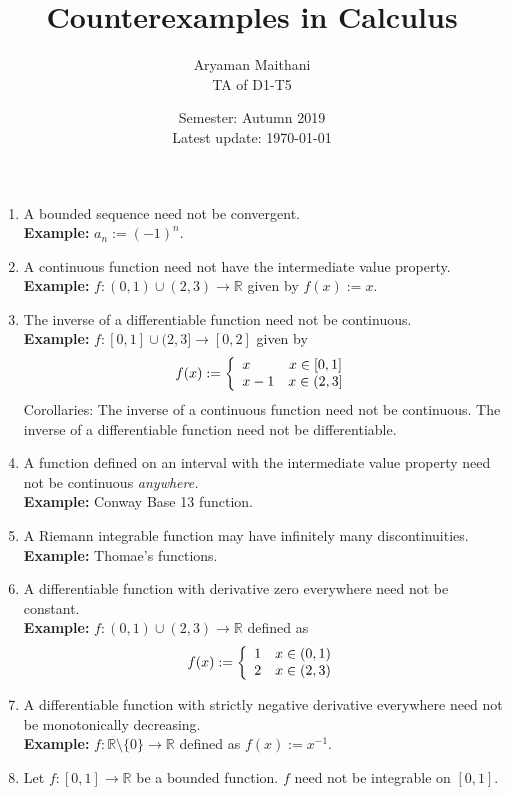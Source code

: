 \documentclass{article}
\title{Counterexamples in Calculus}
\author{Aryaman Maithani\\\small TA of D1-T5}
\date{Semester: Autumn 2019\\ Latest update: \today}
\begin{document}
\maketitle
\hrulefill
\begin{enumerate} 
	\item A bounded sequence need not be convergent.\\
	\textbf{Example:} $a_n := (-1)^n.$
	\item A continuous function need not have the intermediate value property.\\
	\textbf{Example:} $f:(0, 1) \cup (2, 3) \to \mathbb{R}$ given by $f(x) := x.$
	\item The inverse of a differentiable function need not be continuous.\\
	\textbf{Example:} $f:[0, 1] \cup (2, 3] \to [0, 2]$ given by
	\[f(x) := \left\{
	\begin{array}{l c}
		x & x \in [0, 1]\\
		x-1 & x \in (2, 3]		
	\end{array}
	\right.\]
	Corollaries: The inverse of a continuous function need not be continuous. The inverse of a differentiable function need not be differentiable.
	\item A function defined on an interval with the intermediate value property need not be continuous \emph{anywhere.}\\
	\textbf{Example:} Conway Base 13 function.
	\item A Riemann integrable function may have infinitely many discontinuities.\\
	\textbf{Example:} Thomae's functions.
	\item A differentiable function with derivative zero everywhere need not be constant.\\
	\textbf{Example:} $f:(0, 1) \cup (2, 3) \to \mathbb{R}$ defined as
	\[f(x) := \left\{
	\begin{array}{l c}
		1 & x \in (0, 1)\\
		2 & x \in (2, 3)		
	\end{array}
	\right.\]
	\item A differentiable function with strictly negative derivative everywhere need not be monotonically decreasing.\\
	\textbf{Example:} $f:\mathbb{R}\setminus\{0\} \to \mathbb{R}$ defined as $f(x) := x^{-1}.$
	\item \label{diric} Let $f:[0, 1]\to\mathbb{R}$ be a bounded function. $f$ need not be integrable on $[0, 1].$\\

\end{enumerate}
\end{document}
